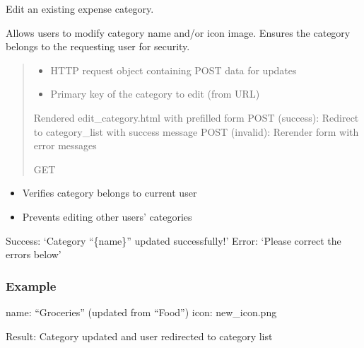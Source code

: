 \documentclass[letterpaper,10pt,english]{sphinxmanual}
\begin{document}
\begin{fulllineitems}
\label{\detokenize{expensesApp:expensesApp.views.edit_category}}
\pysigstartsignatures
\pysiglinewithargsret
{}
{\sphinxparamcomma {}}
{}
\pysigstopsignatures
\sphinxAtStartPar
Edit an existing expense category.

\sphinxAtStartPar
Allows users to modify category name and/or icon image.
Ensures the category belongs to the requesting user for security.
\begin{quote}\begin{description}
\begin{itemize}
\item {} 
\sphinxAtStartPar
{} \textendash{} HTTP request object containing POST data for updates

\item {} 
\sphinxAtStartPar
{} \textendash{} Primary key of the category to edit (from URL)

\end{itemize}

\sphinxAtStartPar
Rendered edit\_category.html with pre\sphinxhyphen{}filled form
POST (success): Redirect to category\_list with success message
POST (invalid): Re\sphinxhyphen{}render form with error messages

\sphinxAtStartPar
GET

\end{description}\end{quote}
\begin{description}
\begin{itemize}
\item {} 
\sphinxAtStartPar
Verifies category belongs to current user

\item {} 
\sphinxAtStartPar
Prevents editing other users’ categories

\end{itemize}

\sphinxAtStartPar
Success: ‘Category “\{name\}” updated successfully!’
Error: ‘Please correct the errors below’

\end{description}
\subsubsection*{Example}
\begin{description}
\sphinxAtStartPar
name: “Groceries” (updated from “Food”)
icon: new\_icon.png

\end{description}

\sphinxAtStartPar
Result: Category updated and user redirected to category list

\end{fulllineitems}
\end{document}
